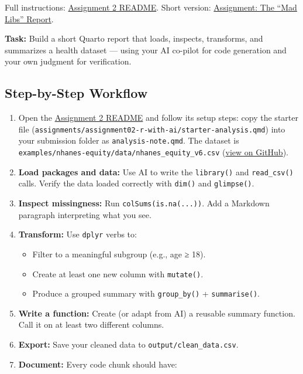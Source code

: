 \documentclass[
  letterpaper,
  DIV=11,
  numbers=noendperiod,
  oneside]{scrreprt}
\providecommand{\tightlist}{%
  \setlength{\itemsep}{0pt}\setlength{\parskip}{0pt}}
\begin{document}
Full instructions:
\href{../../assignments/assignment02-r-with-ai/README.md}{Assignment 2
README}. Short version: \href{r09-assignment-mad-libs.qmd}{Assignment:
The ``Mad Libs'' Report}.

\textbf{Task:} Build a short Quarto report that loads, inspects,
transforms, and summarizes a health dataset --- using your AI co-pilot
for code generation and your own judgment for verification.

\subsection*{Step-by-Step Workflow}\label{step-by-step-workflow-1}

\begin{enumerate}
\def\labelenumi{\arabic{enumi}.}
\tightlist
\item
  Open the
  \href{../../assignments/assignment02-r-with-ai/README.md}{Assignment 2
  README} and follow its setup steps: copy the starter file
  (\texttt{assignments/assignment02-r-with-ai/starter-analysis.qmd})
  into your submission folder as \texttt{analysis-note.qmd}. The dataset
  is \texttt{examples/nhanes-equity/data/nhanes\_equity\_v6.csv}
  (\href{https://github.com/ehsanx/HDSx/blob/main/examples/nhanes-equity/data/nhanes_equity_v6.csv}{view
  on GitHub}).
\item
  \textbf{Load packages and data:} Use AI to write the
  \texttt{library()} and \texttt{read\_csv()} calls. Verify the data
  loaded correctly with \texttt{dim()} and \texttt{glimpse()}.
\item
  \textbf{Inspect missingness:} Run \texttt{colSums(is.na(...))}. Add a
  Markdown paragraph interpreting what you see.
\item
  \textbf{Transform:} Use \texttt{dplyr} verbs to:

  \begin{itemize}
  \tightlist
  \item
    Filter to a meaningful subgroup (e.g., age ≥ 18).
  \item
    Create at least one new column with \texttt{mutate()}.
  \item
    Produce a grouped summary with \texttt{group\_by()} +
    \texttt{summarise()}.
  \end{itemize}
\item
  \textbf{Write a function:} Create (or adapt from AI) a reusable
  summary function. Call it on at least two different columns.
\item
  \textbf{Export:} Save your cleaned data to
  \texttt{output/clean\_data.csv}.
\item
  \textbf{Document:} Every code chunk should have:


\end{enumerate}
\end{document}
